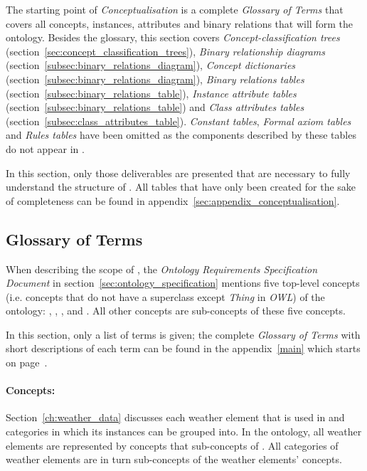 The starting point of \emph{Conceptualisation} is a complete \emph{Glossary of Terms} that covers all concepts, instances, attributes and binary relations that will form the ontology. Besides the glossary, this section covers \emph{Concept-classification trees} (section~\ref{sec:concept_classification_trees}), \emph{Binary relationship diagrams} (section~\ref{subsec:binary_relations_diagram}), \emph{Concept dictionaries} (section~\ref{subsec:binary_relations_diagram}), \emph{Binary relations tables} (section~\ref{subsec:binary_relations_table}), \emph{Instance attribute tables} (section~\ref{subsec:binary_relations_table}) and \emph{Class attributes tables} (section~\ref{subsec:class_attributes_table}). \emph{Constant tables}, \emph{Formal axiom tables} and \emph{Rules tables} have been omitted as the components described by these tables do not appear in \thinkhomeweather.

In this section, only those deliverables are presented that are necessary to fully understand the structure of \thinkhomeweather. All tables that have only been created for the sake of completeness can be found in appendix~\ref{sec:appendix_conceptualisation}.

\subsection{Glossary of Terms}
\label{sec:ontology_glossary}

When describing the scope of \thinkhomeweather, the \emph{Ontology Requirements Specification Document} in section~\ref{sec:ontology_specification} mentions five top-level concepts (i.e. concepts that do not have a superclass except \emph{Thing} in \emph{OWL}) of the ontology: , , , and . All other concepts are sub-concepts of these five concepts.

In this section, only a list of terms is given; the complete \emph{Glossary of Terms} with short descriptions of each term can be found in the appendix~\ref{main} which starts on page~\pageref{main}.

\paragraph{Concepts:}

Section~\ref{ch:weather_data} discusses each weather element that is used in \thinkhomeweather and categories in which its instances can be grouped into. In the ontology, all weather elements are represented by concepts that sub-concepts of . All categories of weather elements are in turn sub-concepts of the weather elements' concepts.

